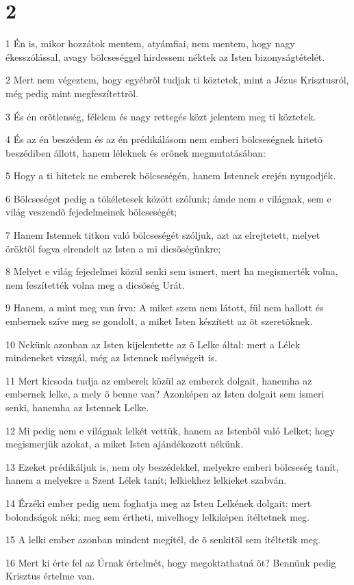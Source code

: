 \chapter{2}

\par 1 Én is, mikor hozzátok mentem, atyámfiai, nem mentem, hogy nagy ékesszólással, avagy bölcseséggel hirdessem néktek az Isten bizonyságtételét.
\par 2 Mert nem végeztem, hogy egyébrõl tudjak ti köztetek, mint a Jézus Krisztusról, még pedig  mint megfeszítettrõl.
\par 3 És én erõtlenség, félelem és nagy rettegés közt jelentem meg  ti köztetek.
\par 4 És az én beszédem és az én prédikálásom nem emberi bölcseségnek hitetõ beszédiben állott, hanem léleknek és erõnek megmutatásában:
\par 5 Hogy a ti hitetek ne emberek bölcseségén, hanem Istennek erején nyugodjék.
\par 6 Bölcseséget pedig a tökéletesek között szólunk; ámde nem e világnak, sem e világ veszendõ fejedelmeinek bölcseségét;
\par 7 Hanem Istennek titkon való bölcseségét szóljuk, azt az elrejtetett, melyet öröktõl fogva elrendelt az Isten a mi dicsõségünkre;
\par 8 Melyet e világ fejedelmei közül senki sem ismert, mert ha megismerték volna, nem feszítették volna meg a dicsõség Urát.
\par 9 Hanem, a mint meg van írva: A miket szem nem látott, fül nem hallott és embernek szíve meg se gondolt, a miket Isten készített az õt szeretõknek.
\par 10 Nekünk azonban az Isten kijelentette az õ  Lelke által: mert a Lélek mindeneket vizsgál, még az Istennek mélységeit is.
\par 11 Mert kicsoda tudja az emberek közül az emberek dolgait, hanemha az embernek lelke, a mely õ benne van? Azonképen az Isten dolgait sem ismeri senki, hanemha az Istennek Lelke.
\par 12 Mi pedig nem e világnak lelkét vettük, hanem az Istenbõl való Lelket; hogy megismerjük azokat, a miket Isten ajándékozott nékünk.
\par 13 Ezeket prédikáljuk is, nem oly beszédekkel, melyekre emberi bölcseség tanít, hanem a melyekre a Szent Lélek tanít; lelkiekhez lelkieket szabván.
\par 14 Érzéki ember pedig nem foghatja meg az Isten Lelkének dolgait: mert  bolondságok néki; meg sem értheti, mivelhogy lelkiképen ítéltetnek meg.
\par 15 A lelki ember azonban mindent megítél, de õ senkitõl sem ítéltetik meg.
\par 16 Mert ki érte fel az Úrnak értelmét, hogy megoktathatná õt? Bennünk pedig Krisztus értelme van.

